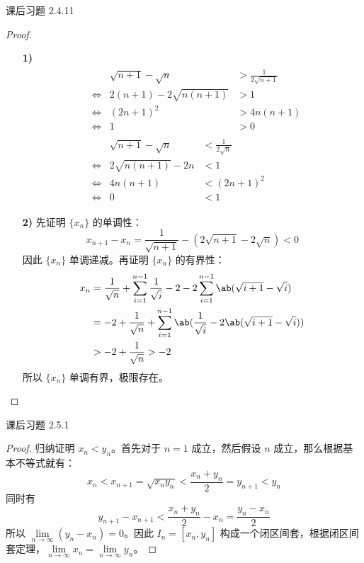 \begin{problem}
	课后习题 2.4.11

	\begin{proof}
		\begin{enumerate}
			\item[\textbf{1)}]
			$$
			\begin{gathered}
				\begin{aligned}
					& \quad & \sqrt{n + 1} - \sqrt{n} & > \frac{1}{2 \sqrt{n + 1}} \\
					& \Leftrightarrow & 2(n + 1) - 2 \sqrt{n(n + 1)} & > 1 \\
					& \Leftrightarrow & (2n + 1)^2 & > 4n(n + 1) \\
					& \Leftrightarrow & 1 & > 0
				\end{aligned}
				\\
				\begin{aligned}
					& \quad & \sqrt{n + 1} - \sqrt{n} & < \frac{1}{2 \sqrt{n}} \\
					& \Leftrightarrow & 2 \sqrt{n(n + 1)} - 2n & < 1 \\
					& \Leftrightarrow & 4n(n + 1) & < (2n + 1)^2 \\
					& \Leftrightarrow & 0 & < 1
				\end{aligned}
			\end{gathered}
			$$

			\item[\textbf{2)}] 先证明 $\{x_n\}$ 的单调性：
			$$
			x_{n+1} - x_n = \frac{1}{\sqrt{n + 1}} - (2 \sqrt{n + 1} - 2 \sqrt{n}) < 0
			$$
			因此 $\{x_n\}$ 单调递减。再证明 $\{x_n\}$ 的有界性：
			$$
			\begin{aligned}
				x_n & = \frac{1}{\sqrt{n}} + \sum_{i=1}^{n-1} \frac{1}{\sqrt{i}} - 2 - 2 \sum_{i=1}^{n-1} \ab(\sqrt{i+1} - \sqrt{i}) \\
				& = -2 + \frac{1}{\sqrt{n}} + \sum_{i=1}^{n-1} \ab(\frac{1}{\sqrt{i}} - 2 \ab(\sqrt{i + 1} - \sqrt{i})) \\
				& > -2 + \frac{1}{\sqrt{n}} > -2
			\end{aligned}
			$$
			所以 $\{x_n\}$ 单调有界，极限存在。
		\end{enumerate}
	\end{proof}
\end{problem}

\begin{problem}
	课后习题 2.5.1

	\begin{proof}
		归纳证明 $x_n < y_n$。首先对于 $n = 1$ 成立，然后假设 $n$ 成立，那么根据基本不等式就有：
		$$
		x_n < x_{n+1} = \sqrt{x_n y_n} < \frac{x_n + y_n}{2} = y_{n+1} < y_n
		$$
		同时有
		$$
		y_{n+1} - x_{n+1} < \frac{x_n + y_n}{2} - x_n = \frac{y_n - x_n}{2}
		$$
		所以 $\lim\limits_{n \to \infty} (y_n - x_n) = 0$。因此 $I_n = [x_n, y_n]$ 构成一个闭区间套，根据闭区间套定理，$\lim\limits_{n \to \infty} x_n = \lim\limits_{n \to \infty} y_n$。
	\end{proof}
\end{problem}

